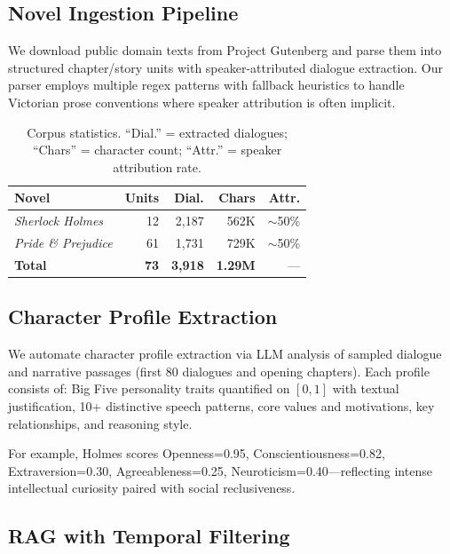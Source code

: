 \documentclass[11pt,a4paper]{article}
\begin{document}
\subsection{Novel Ingestion Pipeline}
\label{sec:ingestion}

We download public domain texts from Project Gutenberg and parse them into structured chapter/story units with speaker-attributed dialogue extraction.
Our parser employs multiple regex patterns with fallback heuristics to handle Victorian prose conventions where speaker attribution is often implicit.

\begin{table}[t]
\centering
\small
\begin{tabular}{@{}lrrrr@{}}
\toprule
\textbf{Novel} & \textbf{Units} & \textbf{Dial.} & \textbf{Chars} & \textbf{Attr.} \\
\midrule
\textit{Sherlock Holmes} & 12 & 2,187 & 562K & $\sim$50\% \\
\textit{Pride \& Prejudice} & 61 & 1,731 & 729K & $\sim$50\% \\
\midrule
\textbf{Total} & \textbf{73} & \textbf{3,918} & \textbf{1.29M} & --- \\
\bottomrule
\end{tabular}
\caption{Corpus statistics. ``Dial.'' = extracted dialogues; ``Chars'' = character count; ``Attr.'' = speaker attribution rate.}
\label{tab:corpus}
\end{table}

\subsection{Character Profile Extraction}
\label{sec:profile}

We automate character profile extraction via LLM analysis of sampled dialogue and narrative passages (first 80 dialogues and opening chapters). Each profile consists of:
Big Five personality traits quantified on $[0,1]$ with textual justification,
10+ distinctive speech patterns,
core values and motivations,
key relationships, and
reasoning style.

For example, Holmes scores Openness=0.95, Conscientiousness=0.82, Extraversion=0.30, Agreeableness=0.25, Neuroticism=0.40---reflecting intense intellectual curiosity paired with social reclusiveness.

\subsection{RAG with Temporal Filtering}
\label{sec:rag}
\end{document}
